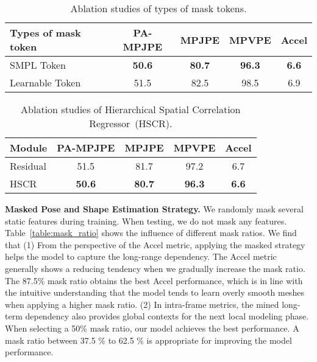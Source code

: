 \documentclass[10pt,twocolumn,letterpaper]{article}
\begin{document}
		
		\begin{table}[t]
			\small
			\centering
			\setlength\tabcolsep{2pt}
			\def\arraystretch{1.0}
			
\begin{tabular}{l|c|c|c|c}
\toprule[2pt]
					Types of mask token & PA-MPJPE & MPJPE &MPVPE  & Accel \\ 
					\midrule[1pt]
					SMPL Token & \textbf{50.6} & \textbf{80.7} &  \textbf{96.3} &  \textbf{6.6} \\
					\cellcolor{Gray}Learnable Token& \cellcolor{Gray}51.5 & \cellcolor{Gray}82.5 & \cellcolor{Gray}98.5 & \cellcolor{Gray}6.9 \\ 
					\bottomrule[1pt]
\end{tabular}
\vspace*{-0.5 em}
			\caption{Ablation studies of types of mask tokens.}
			\vspace{-0.5 em}
			\label{tab:types of mask token}
		\end{table}
		
		\begin{table}[!t]
			\small
			\setlength{\tabcolsep}{6.5 pt}
			\begin{center}
				\begin{tabular}{l | c | c | c | c}
\toprule[2pt]
					\normalsize
					Module & PA-MPJPE & MPJPE & MPVPE & Accel \\
					\midrule[1pt]
					Residual & 51.5 & 81.7 & 97.2 & 6.7 \\
					\cellcolor{Gray}HSCR & \cellcolor{Gray}\textbf{50.6} & \cellcolor{Gray}\textbf{80.7} & \cellcolor{Gray}\textbf{96.3} & \cellcolor{Gray}\textbf{6.6} \\
					\bottomrule[1pt]
\end{tabular}
			\end{center}
			\vspace*{-1.5 em}
			\caption{Ablation studies of Hierarchical Spatial Correlation Regressor~(HSCR).}
			\vspace*{-1.5 em}
			\label{tab:ab_hscr}
		\end{table}
		
		
		


		\noindent\textbf{Masked Pose and Shape Estimation Strategy.}
		We randomly mask several static features during training. When testing, we do not mask any features.
		Table~\ref{table:mask_ratio} shows the influence of different mask ratios. 
		We find that (1) From the perspective of the Accel metric, applying the masked strategy helps the model to capture the long-range dependency. The Accel metric generally shows a reducing tendency when we gradually increase the mask ratio. The 87.5\% mask ratio obtains the best Accel performance, which is in line with the intuitive understanding that the model tends to learn overly smooth meshes when applying a higher mask ratio. (2) In intra-frame metrics, the mined long-term dependency also provides global contexts for the next local modeling phase. When selecting a 50\% mask ratio, our model achieves the best performance. A mask ratio between 37.5 \% to 62.5 \% is appropriate for improving the model performance.
		
\end{document}
